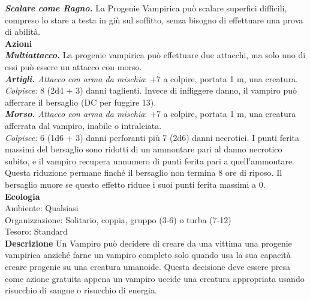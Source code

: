 \begin{multicols}{2}
\emph{\textbf{Scalare come Ragno.}} La Progenie Vampirica può scalare superfici difficili, compreso lo stare a testa in giù sul soffitto, senza bisogno di effettuare una prova di abilità.\\

\smallskip\textbf{Azioni} \\

\emph{\textbf{Multiattacco.}} La progenie vampirica può effettuare due attacchi, ma solo uno di essi può essere un attacco con morso.\\

\emph{\textbf{Artigli.} Attacco con arma da mischia}: +7 a colpire, portata 1 m, una creatura.\\

\emph{Colpisce:} 8 (2d4 + 3) danni taglienti. Invece di infliggere danno, il vampiro può afferrare il bersaglio (DC per fuggire 13).\\

\emph{\textbf{Morso.} Attacco con arma da mischia}: +7 a colpire, portata 1 m, una creatura afferrata dal vampiro, inabile o intralciata.\\

\emph{Colpisce:} 6 (1d6 + 3) danni perforanti più 7 (2d6) danni necrotici. I punti ferita massimi del bersaglio sono ridotti di un ammontare pari al danno necrotico subito, e il vampiro recupera unnumero di punti ferita pari a quell'ammontare. Questa riduzione permane  finché il bersaglio non termina 8 ore di riposo. Il bersaglio muore se  questo effetto riduce i suoi punti ferita massimi a 0.\\
\textbf{Ecologia}\\
Ambiente: Qualsiasi\\
Organizzazione: Solitario, coppia, gruppo (3-6) o turba (7-12)\\
Tesoro: Standard\\
\textbf{Descrizione}
Un Vampiro può decidere di creare da una vittima una progenie vampirica anziché farne un vampiro completo solo quando usa la sua capacità creare progenie su una creatura umanoide. Questa decisione deve essere presa come azione gratuita appena un vampiro uccide una creatura appropriata usando risucchio di sangue o risucchio di energia. \\


\end{multicols}
